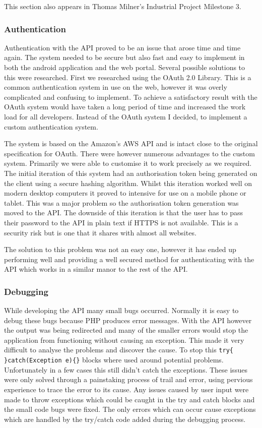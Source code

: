\documentclass[11pt,a4paper]{report}
\begin{document}
This section also appears in Thomas Milner's Industrial Project Milestone 3. 

\subsubsection{Authentication}

Authentication with the API proved to be an issue that arose time and time again. The system needed to be secure but also fast and easy to implement in both the android application and the web portal. Several possible solutions to this were researched. First we researched using the OAuth 2.0 Library. This is a common authentication system in use on the web, however it was overly complicated and confusing to implement. To achieve a satisfactory result with the OAuth system would have taken a long period of time and increased the work load for all developers. Instead of the OAuth system I decided, to implement a custom authentication system. 

The system is based on the Amazon's AWS API and is intact close to the original specification for OAuth. There were however numerous advantages to the custom system. Primarily we were able to customise it to work precisely as we required. The initial iteration of this system had an authorisation token being generated on the client using a secure hashing algorithm. Whilst this iteration worked well on modern desktop computers it proved to intensive for use on a mobile phone or tablet. This was a major problem so the authorisation token generation was moved to the API. The downside of this iteration is that the user has to pass their password to the API in plain text if HTTPS is not available. This is a security risk but is one that it shares with almost all websites. 

The solution to this problem was not an easy one, however it has ended up performing well and providing a well secured method for authenticating with the API which works in a similar manor to the rest of the API. 

\subsubsection{Debugging} 

While developing the API many small bugs occurred. Normally it is easy to debug these bugs because PHP produces error messages. With the API however the output was being redirected and many of the smaller errors would stop the application from functioning without causing an exception.  This made it very difficult to analyse the problems and discover the cause. To stop this \lstinline$try{ }catch(Exception e){}$ blocks where used around potential problems. Unfortunately in a few cases this still didn't catch the exceptions. These issues were only solved through a painstaking process of trail and error, using pervious experience to trace the error to its cause. Any issues caused by user input were made to throw exceptions which could be caught in the try and catch blocks and the small code bugs were fixed. The only errors which can occur cause exceptions which are handled by the try/catch code added during the debugging process.
\end{document}
